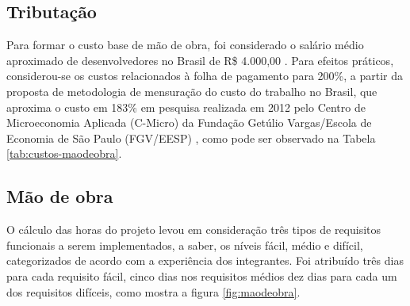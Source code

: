 \documentclass[
    12pt,               %
    openright,          %
    oneside,
    a4paper,            %
    BIBLATEX,           %
    TODO,               %
    english,            %
    brazil              %
    ]{ifsp-spo-inf-ctds}
\begin{document}
        \subsection{Tributação}


            Para formar o custo base de mão de obra, foi considerado o salário médio aproximado de desenvolvedores no Brasil de R\$ 4.000,00  . Para efeitos práticos, considerou-se os custos relacionados à folha de pagamento para 200\%, a partir da proposta de metodologia de mensuração do custo do trabalho no Brasil, que aproxima o custo em 183\% em pesquisa realizada em 2012 pelo Centro de Microeconomia Aplicada (C-Micro) da Fundação Getúlio Vargas/Escola de Economia de São Paulo (FGV/EESP) , como pode ser observado na Tabela \ref{tab:custos-maodeobra}.


        \subsection{Mão de obra}



            O cálculo das horas do projeto levou em consideração três tipos de requisitos funcionais a serem implementados, a saber, os níveis fácil, médio e difícil, categorizados de acordo com a experiência dos integrantes. Foi atribuído três dias para cada requisito fácil, cinco dias nos requisitos médios  dez dias para cada um dos requisitos difíceis, como mostra a figura 
            \ref{fig:maodeobra}.
\end{document}

